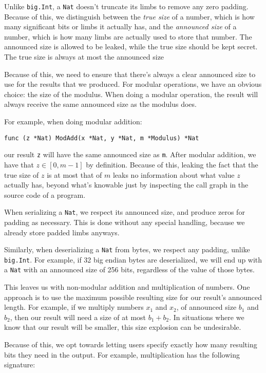 \documentclass[11pt, a4paper]{article} %
\begin{document}
{Unlike \texttt{big.Int}, a \texttt{Nat} doesn't truncate its limbs
to remove any zero padding. Because of this, we distinguish
between the \emph{true size} of a number, which is how many significant
bits or limbs it actually has, and the \emph{announced size}
of a number, which is how many limbs are actually used to store
that number. The announced size is allowed to be leaked, while the
true size should be kept secret. The true size is always
at most the announced size

Because of this, we need to ensure that there's always a clear
announced size to use for the results that we produced. For modular
operations, we have an obvious choice: the size of the modulus.
When doing a modular operation, the result will always receive
the same announced size as the modulus does.

For example, when doing modular addition:

\begin{verbatim}
func (z *Nat) ModAdd(x *Nat, y *Nat, m *Modulus) *Nat
\end{verbatim}

our result \texttt{z} will have the same announced size as \texttt{m}.
After modular addition, we have that $z \in [0, m - 1]$ by definition.
Because of this, leaking the fact that the true size of $z$
is at most that of $m$ leaks no information about what value $z$
actually has, beyond what's knowable just by inspecting the call
graph in the source code of a program.

When serializing a \texttt{Nat}, we respect its announced size,
and produce zeros for padding as necessary. This is done without
any special handling, because we already store padded limbs anyways.

Similarly, when deserializing a \texttt{Nat} from bytes,
we respect any padding, unlike \texttt{big.Int}. For example,
if 32 big endian bytes are deserialized, we will end up
with a \texttt{Nat} with an announced size of 256 bits, regardless
of the value of those bytes.

This leaves us with non-modular addition and multiplication of numbers.
One approach is to use the maximum possible resulting size for our
result's announced length. For example, if we multiply
numbers $x_1$ and $x_2$, of announced size $b_1$ and $b_2$, then
our result will need a size of at most $b_1 + b_2$.
In situations where we know that our result will be smaller,
this size explosion can be undesirable.

Because of this, we opt towards letting users specify exactly how many
resulting bits they need in the output. For example,
multiplication has the following signature:

}
\end{document}
